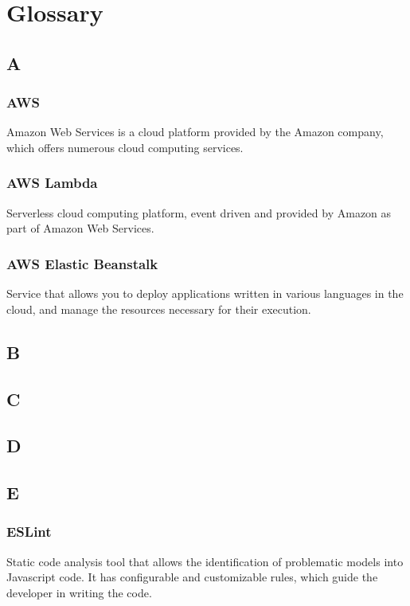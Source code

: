 \section{Glossary}

	\subsection{A}
		\subsubsection*{AWS}
			Amazon Web Services is a cloud platform provided by the Amazon company, which offers numerous cloud computing services.
		\subsubsection*{AWS Lambda}
			Serverless cloud computing platform, event driven and provided by Amazon as part of Amazon Web Services.
			
		\subsubsection*{AWS Elastic Beanstalk}
			Service that allows you to deploy applications written in various languages in the cloud, and manage the resources necessary for their execution.
	
	\subsection{B}
	
	
	\subsection{C}
	
	
	\subsection{D}
	
	
	\subsection{E}
		\subsubsection*{ESLint}
			Static code analysis tool that allows the identification of problematic models into Javascript code. It has configurable and customizable rules, which guide the developer in writing the code.
